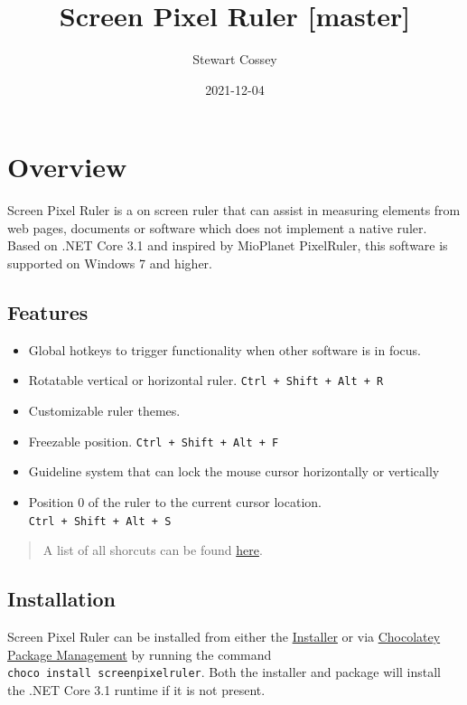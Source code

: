 \documentclass[
]{book}
\title{Screen Pixel Ruler {[}master{]}}
\author{Stewart Cossey}
\date{2021-12-04}
\providecommand{\tightlist}{%
  \setlength{\itemsep}{0pt}\setlength{\parskip}{0pt}}
\begin{document}
\maketitle

{
\setcounter{tocdepth}{1}
\tableofcontents
}
\hypertarget{overview}{%
\chapter{Overview}\label{overview}}

Screen Pixel Ruler is a on screen ruler that can assist in measuring elements from web pages, documents or software which does not implement a native ruler.
Based on .NET Core 3.1 and inspired by MioPlanet PixelRuler, this software is supported on Windows 7 and higher.

\hypertarget{features}{%
\section{Features}\label{features}}

\begin{itemize}
\tightlist
\item
  Global hotkeys to trigger functionality when other software is in focus.
\item
  Rotatable vertical or horizontal ruler. \texttt{Ctrl\ +\ Shift\ +\ Alt\ +\ R}
\item
  Customizable ruler themes.
\item
  Freezable position. \texttt{Ctrl\ +\ Shift\ +\ Alt\ +\ F}
\item
  Guideline system that can lock the mouse cursor horizontally or vertically
\item
  Position 0 of the ruler to the current cursor location. \texttt{Ctrl\ +\ Shift\ +\ Alt\ +\ S}
\end{itemize}

\begin{quote}
A list of all shorcuts can be found \protect\hyperlink{keyboard}{here}.
\end{quote}

\hypertarget{installation}{%
\section{Installation}\label{installation}}

Screen Pixel Ruler can be installed from either the \href{https://github.com/Cossey/ScreenPixelRuler2/releases}{Installer} or via \href{https://chocolatey.org}{Chocolatey Package Management} by running the command \texttt{choco\ install\ screenpixelruler}.
Both the installer and package will install the .NET Core 3.1 runtime if it is not present.
\end{document}
